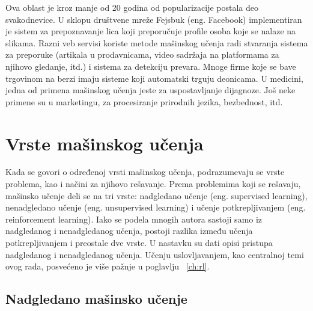 Ova oblast je kroz manje od 20 godina od popularizacije postala deo svakodnevice. U sklopu društvene mreže Fejsbuk (eng. Facebook) implementiran je sistem za prepoznavanje lica koji preporučuje profile osoba koje se nalaze na slikama. Razni veb servisi koriste metode mašinskog učenja radi stvaranja sistema za preporuke (artikala u prodavnicama, video sadržaja na platformama za njihovo gledanje, itd.) i sistema za detekciju prevara. Mnoge firme koje se bave trgovinom na berzi imaju sisteme koji automatski trguju deonicama. U medicini, jedna od primena mašinskog učenja jeste za uspostavljanje dijagnoze. Još neke primene su u marketingu, za procesiranje prirodnih jezika, bezbednost, itd.


\section{Vrste mašinskog učenja}

Kada se govori o određenoj vrsti mašinskog učenja, podrazumevaju se vrste problema, kao i načini za njihovo rešavanje. Prema problemima koji se rešavaju, mašinsko učenje deli se na tri vrste: nadgledano učenje (eng. supervised learning), nenadgledano učenje (eng. unsupervised learning) i učenje potkrepljivanjem (eng. reinforcement learning). Iako se podela mnogih autora sastoji samo iz nadgledanog i nenadgledanog učenja, postoji razlika između učenja potkrepljivanjem i preostale dve vrste. U nastavku su dati opisi pristupa nadgledanog i nenadgledanog učenja. Učenju uslovljavanjem, kao centralnoj temi ovog rada, posvećeno je više pažnje u poglavlju~ \ref{ch:rl}. 

\subsection{Nadgledano mašinsko učenje}

